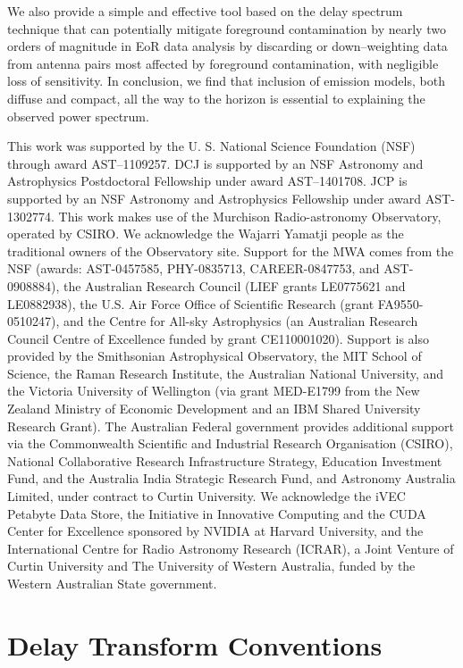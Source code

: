 \documentclass[preprint2,iop,numberedappendix,twocolappendix,appendixfloats]{emulateapj}
\begin{document}
We also provide a simple and effective tool based on the delay spectrum technique that can potentially mitigate foreground contamination by nearly two orders of magnitude in EoR data analysis by discarding or down--weighting data from antenna pairs most affected by foreground contamination, with negligible loss of sensitivity. In conclusion, we find that inclusion of emission models, both diffuse and compact, all the way to the horizon is essential to explaining the observed power spectrum. 

\acknowledgments

This work was supported by the U. S. National Science Foundation (NSF) through award AST--1109257. DCJ is supported by an NSF Astronomy and Astrophysics Postdoctoral Fellowship under award AST--1401708. JCP is supported by an NSF Astronomy and Astrophysics Fellowship under award AST-1302774. This work makes use of the Murchison Radio-astronomy Observatory, operated by CSIRO. We acknowledge the Wajarri Yamatji people as the traditional owners of the Observatory site. Support for the MWA comes from the NSF (awards: AST-0457585, PHY-0835713, CAREER-0847753, and AST-0908884), the Australian Research Council (LIEF grants LE0775621 and LE0882938), the U.S. Air Force Office of Scientific Research (grant FA9550-0510247), and the Centre for All-sky Astrophysics (an Australian Research Council Centre of Excellence funded by grant CE110001020). Support is also provided by the Smithsonian Astrophysical Observatory, the MIT School of Science, the Raman Research Institute, the Australian National University, and the Victoria University of Wellington (via grant MED-E1799 from the New Zealand Ministry of Economic Development and an IBM Shared University Research Grant). The Australian Federal government provides additional support via the Commonwealth Scientific and Industrial Research Organisation (CSIRO), National Collaborative Research Infrastructure Strategy, Education Investment Fund, and the Australia India Strategic Research Fund, and Astronomy Australia Limited, under contract to Curtin University. We acknowledge the iVEC Petabyte Data Store, the Initiative in Innovative Computing and the CUDA Center for Excellence sponsored by NVIDIA at Harvard University, and the International Centre for Radio Astronomy Research (ICRAR), a Joint Venture of Curtin University and The University of Western Australia, funded by the Western Australian State government.  

\appendix

\section{Delay Transform Conventions}\label{sec:delay-conventions}
\end{document}

